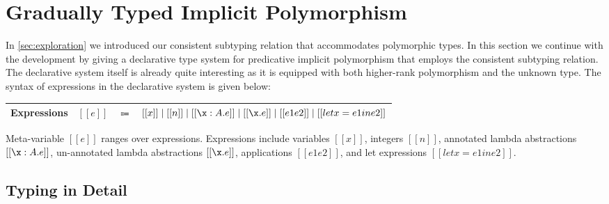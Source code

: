 \section{Gradually Typed Implicit Polymorphism}
\label{sec:type-system}

In \cref{sec:exploration} we introduced our consistent
subtyping relation that accommodates polymorphic types. In
this section we continue with the development by giving a declarative
type system for predicative implicit polymorphism that employs the consistent
subtyping relation. The declarative system itself is already quite
interesting as it is equipped with both higher-rank polymorphism and
the unknown type.
The syntax of expressions in the declarative system is given below:
\begin{center}
  \begin{tabular}{lrcl} \toprule
    Expressions &  $[[e]]$   & $\Coloneqq$ & $[[x]]  \mid [[n]]  \mid [[\x : A . e]] \mid [[ \x . e ]] \mid [[e1 e2]] \mid [[ let x = e1 in e2  ]]$ \\ \bottomrule
  \end{tabular}
\end{center}
Meta-variable $[[e]]$ ranges over expressions.
Expressions include variables $[[x]]$, integers $[[n]]$, annotated lambda
abstractions $[[\x : A . e]]$, un-annotated lambda abstractions $[[\x . e]]$,
applications $[[e1 e2]]$, and let expressions $[[let x = e1 in e2]]$.


\subsection{Typing in Detail}

